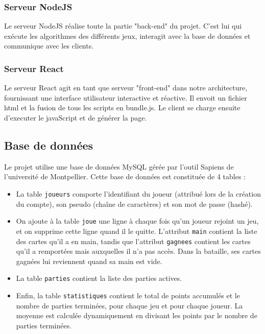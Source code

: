 \documentclass[a4paper]{article}
\begin{document}
\subsubsection{Serveur NodeJS} Le serveur NodeJS réalise toute la partie "back-end" du projet. C'est lui qui exécute les algorithmes des différents jeux, interagit avec la base de données et communique avec les clients.
\subsubsection{Serveur React}
Le serveur React agit en tant que serveur "front-end" dans notre architecture, fournissant une interface utilisateur interactive et réactive. Il envoit un fichier html et la fusion de tous les scripts en bundle.js. Le client se charge ensuite d'executer le javaScript et de générer la page. 

\subsection{Base de données}
Le projet utilise une base de données MySQL gérée par l'outil Sapiens de l'université de Montpellier. Cette base de données est constituée de 4 tables :
\begin{itemize}
\item La table \texttt{joueurs} comporte l'identifiant du joueur (attribué lors de la création du compte), son pseudo (chaîne de caractères) et son mot de passe (hashé). 
\item On ajoute à la table \texttt{joue} une ligne à chaque fois qu'un joueur rejoint un jeu, et on supprime cette ligne quand il le quitte. L'attribut \texttt{main} contient la liste des cartes qu'il a en main, tandis que l'attribut \texttt{gagnees} contient les cartes qu'il a remportées mais auxquelles il n'a pas accès. Dans la bataille, ses cartes gagnées lui reviennent quand sa main est vide.
\item La table \texttt{parties} contient la liste des parties actives.
\item Enfin, la table \texttt{statistiques} contient le total de points accumulés et le nombre de parties terminées, pour chaque jeu et pour chaque joueur. La moyenne est calculée dynamiquement en divisant les points par le nombre de parties terminées.
\end{itemize}
\end{document}
